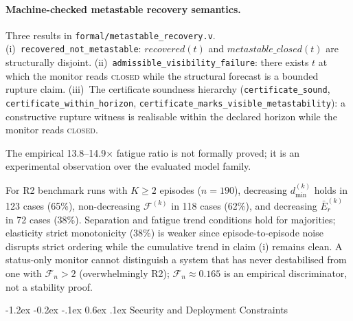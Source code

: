 \documentclass{llncs}
\makeatletter
\renewcommand\section{\@startsection{section}{1}{\z@}%
  {-1.2ex \@plus -0.2ex \@minus -.1ex}%
  {0.6ex \@plus .1ex}%
  {\normalfont\large\bfseries}}
\newcommand{\st}[1]{\textup{\textsc{#1}}}
\makeatother
\begin{document}
{\sloppy\paragraph{Machine-checked metastable recovery semantics.}
Three results in \texttt{formal/\allowbreak{}metastable\_recovery.v}.
(i)~\texttt{recovered\_not\_\allowbreak{}metastable}: $\mathit{recovered}(t)$
and $\mathit{metastable\_closed}(t)$ are structurally disjoint.
(ii)~\texttt{admissible\_\allowbreak{}visibility\_failure}: there exists
$t$ at which the monitor reads \st{closed} while the structural forecast
is a bounded rupture claim.
(iii)~The certificate soundness hierarchy
(\texttt{certificate\_sound},
\texttt{certificate\_\allowbreak{}within\_horizon},
\texttt{certificate\_\allowbreak{}marks\_visible\_\allowbreak{}metastability}):
a constructive rupture witness is realisable within the declared horizon
while the monitor reads \st{closed}.\par}

The empirical 13.8--14.9$\times$ fatigue ratio is not formally proved;
it is an experimental observation over the evaluated model family.

For R2 benchmark runs with $K \geq 2$ episodes ($n=190$), decreasing
$d_{\min}^{(k)}$ holds in 123 cases (65\%), non-decreasing
$\mathcal{F}^{(k)}$ in 118 cases (62\%), and decreasing
$\bar{E}_r^{(k)}$ in 72 cases (38\%). Separation and fatigue trend
conditions hold for majorities; elasticity
strict monotonicity (38\%) is weaker since episode-to-episode noise
disrupts strict ordering while the cumulative trend in claim (i)
remains clean. A status-only monitor cannot distinguish a system that
has never destabilised from one with $\mathcal{F}_n > 2$ (overwhelmingly
R2); $\mathcal{F}_n \approx 0.165$ is an empirical discriminator, not a
stability proof.

\section{Security and Deployment Constraints}
\label{sec:security}
\end{document}
